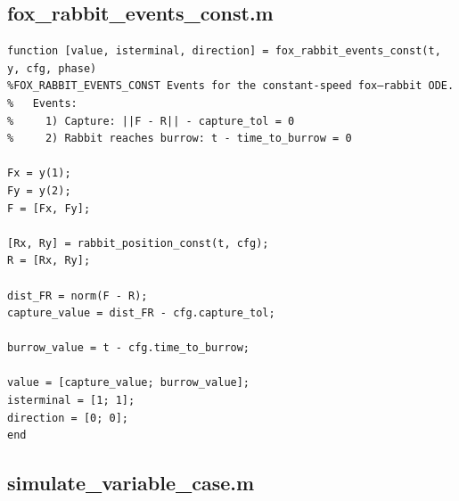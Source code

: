 \documentclass[a4paper,11pt]{article}
\begin{document}
\subsection*{fox\_rabbit\_events\_const.m}

{\footnotesize
\begin{verbatim}
function [value, isterminal, direction] = fox_rabbit_events_const(t, y, cfg, phase)
%FOX_RABBIT_EVENTS_CONST Events for the constant-speed fox–rabbit ODE.
%   Events:
%     1) Capture: ||F - R|| - capture_tol = 0
%     2) Rabbit reaches burrow: t - time_to_burrow = 0

Fx = y(1);
Fy = y(2);
F = [Fx, Fy];

[Rx, Ry] = rabbit_position_const(t, cfg);
R = [Rx, Ry];

dist_FR = norm(F - R);
capture_value = dist_FR - cfg.capture_tol;

burrow_value = t - cfg.time_to_burrow;

value = [capture_value; burrow_value];
isterminal = [1; 1];
direction = [0; 0];
end
\end{verbatim}
}

\subsection*{simulate\_variable\_case.m}
\end{document}
